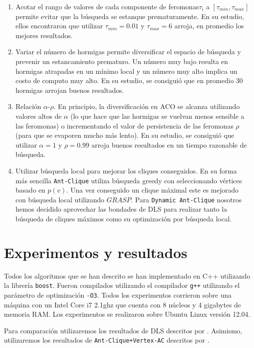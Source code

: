 \documentclass[conference]{IEEEtran}
\begin{document}
\begin{enumerate}
\item Acotar el rango de valores de cada componente de
  feromonas$\tau_i$ a $[\tau_{min}, \tau_{max}]$ permite evitar que la
  búsqueda se estanque prematuramente. En su estudio, ellos
  encontraron que utilizar $\tau_{min} = 0.01$ y $\tau_{max} = 6$
  arroja, en promedio los mejores resultados.
\item Variar el número de hormigas permite diversificar el espacio de
  búsqueda y prevenir un estancamiento prematuro. Un número muy bajo
  resulta en hormigas atrapadas en un mínimo local y un número muy
  alto implica un costo de computo muy alto. En su estudio, se
  consiguió que en promedio 30 hormigas arrojan buenos resultados.
\item Relación $\alpha$-$\rho$. En principio, la diversificación en
  ACO se alcanza utilizando valores altos de $\alpha$ (lo que hace que
  las hormigas se vuelvan menos sensible a las feromonas) o
  incrementando el valor de persistencia de las feromonas $\rho$ (para
  que se evaporen mucho más lento). En su estudio, se consiguió que
  utilizar $\alpha = 1$ y $\rho = 0.99$ arroja buenos resultados en un
  tiempo razonable de búsqueda.
\item Utilizar búsqueda local para mejorar los cliques conseguidos. En
  su forma más sencilla \texttt{Ant-Clique} utiliza búsqueda greedy
  con seleccionando vértices basado en $p(v)$. Una vez conseguido un
  clique máximal este es mejorado con búsqueda local utilizando
  $GRASP$. Para \texttt{Dynamic Ant-Clique} nosotros hemos decidido
  aprovechar las bondades de DLS para realizar tanto la búsqueda de
  cliques máximos como su optimización por búsqueda local.
\end{enumerate}

\section{Experimentos y resultados}
\label{sec:experiments}

Todos los algoritmos que se han descrito se han implementado en C++
utilizando la librería \texttt{boost}. Fueron compilados utilizando el
compilador \texttt{g++} utilizando el parámetro de optimización
\texttt{-O3}. Todos los experimentos corrieron sobre una máquina con
un Intel Core i7 2.1ghz que cuenta con 8 núcleos y 4 gigabytes de
memoria RAM. Los experimentos se realizaron sobre Ubuntu Linux versión
12.04.

Para comparación utilizaremos los resultados de DLS descritos por
\cite{dynamicl}. Asimismo, utilizaremos los resultados de
\texttt{Ant-Clique+Vertex-AC} descritos por \cite{aco2}.
\end{document}
